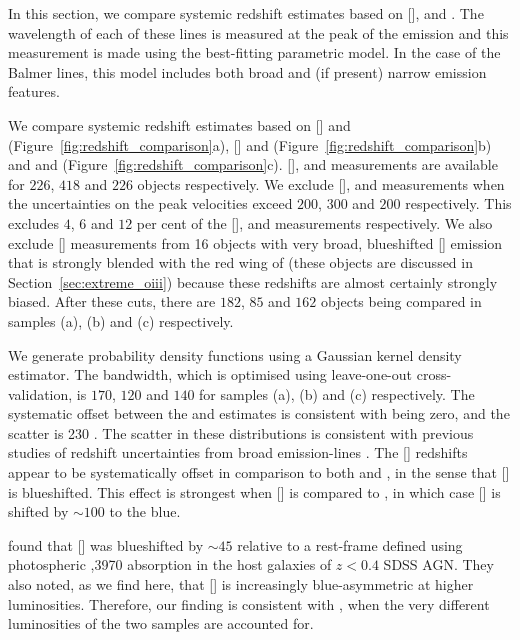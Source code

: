 In this section, we compare systemic redshift estimates based on [], \hb and \hans. 
The wavelength of each of these lines is measured at the peak of the emission and this measurement is made using the best-fitting parametric model. 
In the case of the Balmer lines, this model includes both broad and (if present) narrow emission features. 

We compare systemic redshift estimates based on [] and \hb (Figure~\ref{fig:redshift_comparison}a), [] and \ha (Figure~\ref{fig:redshift_comparison}b) and \hb and \ha (Figure~\ref{fig:redshift_comparison}c). 
[], \hb and \ha measurements are available for $226$, $418$ and $226$ objects respectively. 
We exclude [], \hb and \ha measurements when the uncertainties on the peak velocities exceed $200$, $300$ and $200$ \kms respectively. 
This excludes $4$, $6$ and $12$ per cent of the [], \hb and \ha measurements respectively. 
We also exclude [] measurements from 16 objects with very broad, blueshifted [] emission that is strongly blended with the red wing of \hb (these objects are discussed in Section~\ref{sec:extreme_oiii}) because these redshifts are almost certainly strongly biased.
After these cuts, there are $182$, $85$ and $162$ objects being compared in samples (a), (b) and (c) respectively. 

We generate probability density functions using a Gaussian kernel density estimator.
The bandwidth, which is optimised using leave-one-out cross-validation, is $170$, $120$ and $140$ \kms for samples (a), (b) and (c) respectively. 
The systematic offset between the \ha and \hb estimates is consistent with being zero, and the scatter is 230 \kms. 
The scatter in these distributions is consistent with previous studies of redshift uncertainties from broad emission-lines \citep[e.g.][]{shen16b}. 
The [] redshifts appear to be systematically offset in comparison to both \ha and \hbns, in the sense that [] is blueshifted. 
This effect is strongest when [] is compared to \hbns, in which case [] is shifted by $\sim100$ \kms to the blue.

\citet{hewett10} found that [] was blueshifted by $\sim45$ \kms relative to a rest-frame defined using photospheric ,3970 absorption in the host galaxies of $z<0.4$ SDSS AGN. 
They also noted, as we find here, that [] is increasingly blue-asymmetric at higher luminosities. 
Therefore, our finding is consistent with \citet{hewett10}, when the very different luminosities of the two samples are accounted for.  

